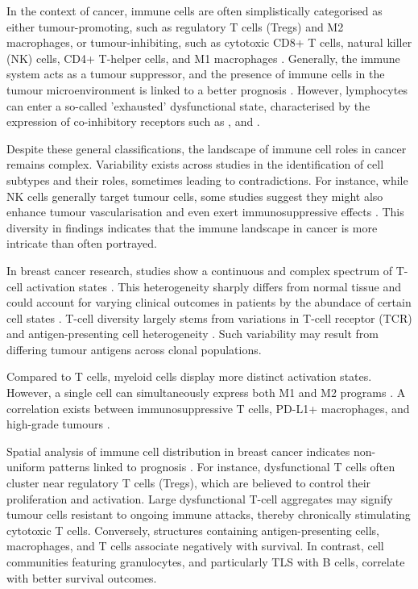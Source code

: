 In the context of cancer, immune cells are often simplistically categorised as either tumour-promoting, such as regulatory T cells (Tregs) and M2 macrophages, or tumour-inhibiting, such as cytotoxic CD8+ T cells, natural killer (NK) cells, CD4+ T-helper cells, and M1 macrophages . Generally, the immune system acts as a tumour suppressor, and the presence of immune cells in the tumour microenvironment is linked to a better prognosis . However, lymphocytes can enter a so-called 'exhausted' dysfunctional state, characterised by the expression of co-inhibitory receptors such as ,  and .

Despite these general classifications, the landscape of immune cell roles in cancer remains complex. Variability exists across studies in the identification of cell subtypes and their roles, sometimes leading to contradictions. For instance, while NK cells generally target tumour cells, some studies suggest they might also enhance tumour vascularisation and even exert immunosuppressive effects \parencite{Retecki2021-se}. This diversity in findings indicates that the immune landscape in cancer is more intricate than often portrayed.

In breast cancer research, studies show a continuous and complex spectrum of T-cell activation states \parencite{Azizi2018-vc}. This heterogeneity sharply differs from normal tissue and could account for varying clinical outcomes in patients by the abundace of certain cell states \parencite{Azizi2018-vc,Savas2018-vb}. T-cell diversity largely stems from variations in T-cell receptor (TCR) and antigen-presenting cell heterogeneity \parencite{Azizi2018-vc}. Such variability may result from differing tumour antigens across clonal populations.

Compared to T cells, myeloid cells display more distinct activation states. However, a single cell can simultaneously express both M1 and M2 programs \parencite{Azizi2018-vc}. A correlation exists between immunosuppressive T cells, PD-L1+ macrophages, and high-grade tumours \parencite{Wagner2019-zp}.

Spatial analysis of immune cell distribution in breast cancer indicates non-uniform patterns linked to prognosis \parencite{Danenberg2022-zb}. For instance, dysfunctional T cells often cluster near regulatory T cells (Tregs), which are believed to control their proliferation and activation. Large dysfunctional T-cell aggregates may signify tumour cells resistant to ongoing immune attacks, thereby chronically stimulating cytotoxic T cells. Conversely, structures containing antigen-presenting cells, macrophages, and T cells associate negatively with survival. In contrast, cell communities featuring granulocytes, and particularly \acf{TLS} with B cells, correlate with better survival outcomes.


